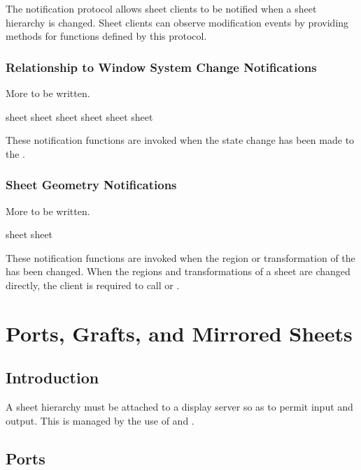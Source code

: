 The notification protocol allows sheet clients to be notified when a sheet
hierarchy is changed.  Sheet clients can observe modification events by
providing  methods for functions defined by this protocol.

\subsection {Relationship to Window System Change Notifications}

 {More to be written.}

   {sheet}
 {sheet}
   {sheet}
  {sheet}
   {sheet}
  {sheet}

These notification functions are invoked when the state change has been made to
the  .


\subsection {Sheet Geometry Notifications}

 {More to be written.}

 {sheet}
 {sheet}

These notification functions are invoked when the region or transformation of
the  has been changed.  When the regions and
transformations of a sheet are changed directly, the client is required to call
 or .


\chapter {Ports, Grafts, and Mirrored Sheets}
\label{ports-and-grafts}

\section {Introduction}

A sheet hierarchy must be attached to a display server so as to permit input and
output.  This is managed by the use of  and .

\section {Ports}

